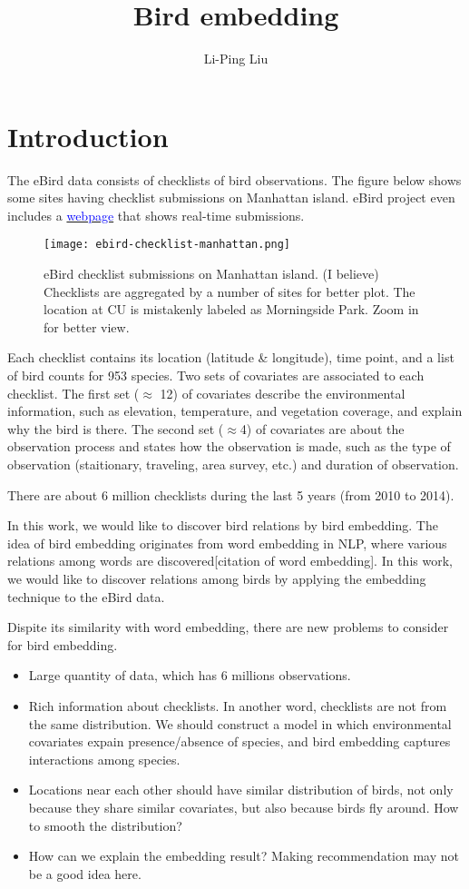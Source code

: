 \documentclass{article}
\title{Bird embedding}
\author{Li-Ping Liu}
\date{}
\begin{document}
\maketitle

\section{Introduction}

The eBird data consists of checklists of bird observations. The figure below shows some sites having checklist submissions on Manhattan island. eBird project even includes a \href{http://ebird.org/ebird/livesubs}{\textcolor{blue}{webpage}} that shows real-time submissions. 


\begin{figure}[h]
    \centering
    \texttt{[image: ebird-checklist-manhattan.png]}
    \caption{eBird checklist submissions on Manhattan island. (I believe) Checklists are aggregated by a number of sites for better plot. The location at CU is mistakenly labeled as Morningside Park. Zoom in for better view. }
    \label{fig1}
\end{figure}


Each checklist contains its location (latitude \& longitude), time point, and a list of bird counts for 953 species. Two sets of covariates are associated to each checklist. The first set ($\approx$ 12) of covariates describe the environmental information, such as elevation, temperature, and vegetation coverage, and explain why the bird is there. The second set ($\approx$4) of covariates are about the observation process and states how the observation is made, such as the type of observation (staitionary, traveling, area survey, etc.) and duration of observation. 

There are about 6 million checklists during the last 5 years (from 2010 to 2014). 

In this work, we would like to discover bird relations by bird embedding. The idea of bird embedding originates from word embedding in NLP, where various relations among words are discovered[citation of word embedding]. In this work, we would like to discover relations among birds by applying the embedding technique to the eBird data. 

Dispite its similarity with word embedding, there are new problems to consider for bird embedding. 
\begin{itemize}
\item Large quantity of data, which has 6 millions observations.
\item Rich information about checklists. In another word, checklists are not from the same distribution. We should construct a model in which environmental covariates expain presence/absence of species, and bird embedding captures interactions among species.  
\item Locations near each other should have similar distribution of birds, not only because they share similar covariates, but also because birds fly around. How to smooth the distribution?
\item How can we explain the embedding result? Making recommendation may not be a good idea here. 
\end{itemize}
\end{document}
